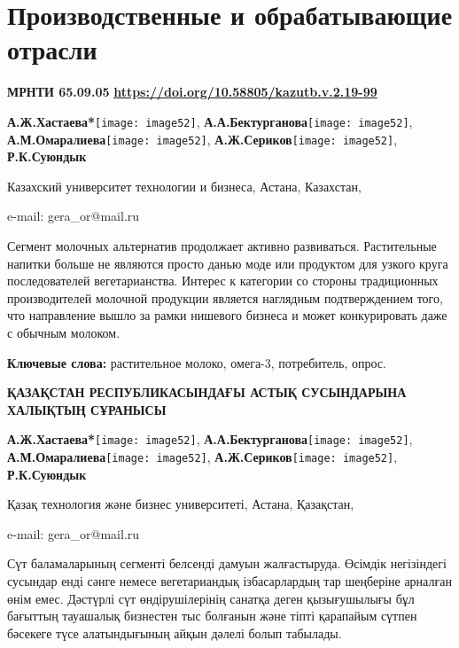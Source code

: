 \let\cleardoublepage\clearpage
\chapter{Производственные и обрабатывающие отрасли}

{\bfseries МРНТИ 65.09.05}\hfill
\hfill {\bfseries \href{https://doi.org/10.58805/kazutb.v.2.19-99}{https://doi.org/10.58805/kazutb.v.2.19-99}}



\begin{center}
{\bfseries А.Ж.Хастаева*}\texttt{[image: image52]},
{\bfseries А.А.Бектурганова}\texttt{[image: image52]},
{\bfseries А.М.Омаралиева}\texttt{[image: image52]},
{\bfseries А.Ж.Сериков}\texttt{[image: image52]},
{\bfseries Р.К.Суюндык}

Казахский университет технологии и бизнеса, Астана, Казахстан,

e-mail: gera\_or@mail.ru
\end{center}

Сегмент молочных альтернатив продолжает активно развиваться.
Растительные напитки больше не являются просто данью моде или продуктом
для узкого круга последователей вегетарианства. Интерес к категории со
стороны традиционных производителей молочной продукции является
наглядным подтверждением того, что направление вышло за рамки нишевого
бизнеса и может конкурировать даже с обычным молоком.

{\bfseries Ключевые слова:} растительное молоко, омега-3, потребитель,
опрос.

\begin{center}
{\large\bfseries ҚАЗАҚСТАН РЕСПУБЛИКАСЫНДАҒЫ АСТЫҚ СУСЫНДАРЫНА ХАЛЫҚТЫҢ СҰРАНЫСЫ}

\vspace{1em}
{\bfseries А.Ж.Хастаева*}\texttt{[image: image52]},
{\bfseries А.А.Бектурганова}\texttt{[image: image52]},
{\bfseries А.М.Омаралиева}\texttt{[image: image52]},
{\bfseries А.Ж.Сериков}\texttt{[image: image52]},
{\bfseries Р.К.Суюндык}

Қазақ технология және бизнес университеті, Астана, Қазақстан,

e-mail: gera\_or@mail.ru
\end{center}

Сүт баламаларының сегменті белсенді дамуын жалғастыруда. Өсімдік
негізіндегі сусындар енді сәнге немесе вегетариандық ізбасарлардың тар
шеңберіне арналған өнім емес. Дәстүрлі сүт өндірушілерінің санатқа деген
қызығушылығы бұл бағыттың тауашалық бизнестен тыс болғанын және тіпті
қарапайым сүтпен бәсекеге түсе алатындығының айқын дәлелі болып
табылады.

